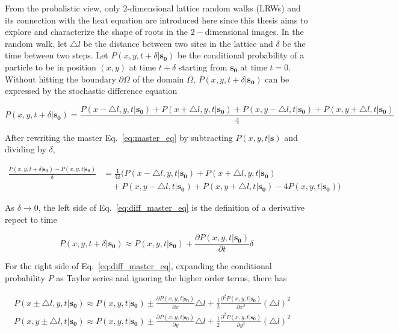 From the probalistic view, only $2$-dimensional lattice random walks
(LRWs) and its connection with the heat equation are introduced here
since this thesis aims to explore and characterize the shape of roots
in the $2-$dimensional images. In the random walk, let $\triangle l$
be the distance between two sites in the lattice and $\delta$ be the
time between two steps. Let $P(x, y, t + \delta | \bm{s_0})$ be the
conditional probability of a particle to be in position $(x, y)$ at
time $t + \delta$ starting from $\bm{s_0}$ at time $t=0$. Without
hitting the boundary $\partial \Omega$ of the domain $\Omega$, $P(x,
y, t + \delta | \bm{s_0})$ can be expressed by the stochastic
difference equation

\begin{equation}\label{eq:master_eq}
  P(x, y, t + \delta | \bm{s_0}) = \frac{P(x - \triangle l, y, t | \bm{s_0}) +  P(x + \triangle l, y, t | \bm{s_0}) + P(x, y - \triangle l, t | \bm{s_0}) + P(x, y + \triangle l, t | \bm{s_0})}{4}
\end{equation}

After rewriting the master Eq.~\ref{eq:master_eq} by subtracting $P(x, y, t  | \bm{s})$ and dividing by $\delta$,

\begin{equation}
  \begin{split}
  \frac{P(x, y, t + \delta| \bm{s_0}) - P(x, y, t | \bm{s_0})}{\delta} &= \frac{1}{4\delta} \Big( P(x - \triangle l, y, t | \bm{s_0}) + P(x + \triangle l, y, t | \bm{s_0}) \label{eq:diff_master_eq} \\
  &\quad + P(x, y - \triangle l, t  | \bm{s_0}) + P(x, y + \triangle l, t | \bm{s_0}) - 4 P(x, y, t| \bm{s_0}) \Big) 
  \end{split}
\end{equation}


As $\delta \rightarrow 0$, the left side of
Eq.~\ref{eq:diff_master_eq} is the definition of a derivative repect
to time

\begin{equation}\label{eq:time_derivative}
  P(x, y, t + \delta | \bm{s_0}) \approx P(x, y, t | \bm{s_0}) +
  \frac{\partial P(x, y, t | \bm{s_0})}{\partial t}\delta
\end{equation}


For the right side of Eq.~\ref{eq:diff_master_eq}, expanding the
conditional probability $P$ as Taylor series and ignoring the higher
order terms, there has

\begin{align}
  P(x \pm \triangle l, y, t | \bm{s_0}) \approx P(x, y, t | \bm{s_0}) \pm \frac{\partial P(x, y, t | \bm{s_0})}{\partial x} \triangle l + \frac{1}{2} \frac{\partial ^2 P(x, y, t | \bm{s_0})}{\partial x^2}(\triangle l)^2 \quad \label{eq:Taylor_x}\\
  P(x, y \pm \triangle l, t | \bm{s_0}) \approx P(x, y, t | \bm{s_0}) \pm \frac{\partial P(x, y, t | \bm{s_0})}{\partial y} \triangle l + \frac{1}{2} \frac{\partial ^2 P(x, y, t | \bm{s_0})}{\partial y^2}(\triangle l)^2 \quad \label{eq:Taylor_y}
\end{align}



